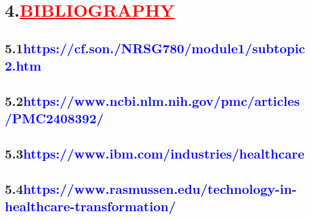 \documentclass[12pt]{article}
\begin{document}
\section*{\textbf{4.\hspace{1cm}\textcolor{red}{\underline{\huge{BIBLIOGRAPHY}}}}}
\vspace{0.2cm}
\subsection*{\textbf{5.1\hspace{1cm}\large{\textcolor{blue}{https://cf.son./NRSG780/module1/subtopic2.htm}}}}
\subsection*{\textbf{5.2\hspace{1cm}\large{\textcolor{blue}{https://www.ncbi.nlm.nih.gov/pmc/articles/PMC2408392/}}}}
\subsection*{\textbf{5.3\hspace{1cm}\large{\textcolor{blue}{https://www.ibm.com/industries/healthcare}}}}
\subsection*{\textbf{5.4\hspace{1cm}\large{\textcolor{blue}{https://www.rasmussen.edu/technology-in-healthcare-transformation/}}}}
\end{document}
